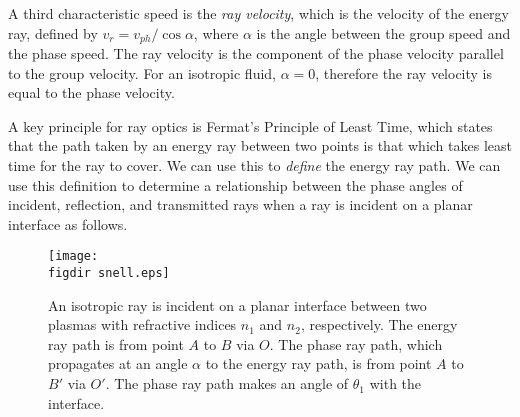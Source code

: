 \documentclass[12pt]{../style-files/ociamthesis}
\begin{document}
	A third characteristic speed is the \textit{ray velocity}, which is the velocity of the energy ray, defined by $v_r = v_{ph}/\cos{\alpha}$, where $\alpha$ is the angle between the group speed and the phase speed. The ray velocity is the component of the phase velocity parallel to the group velocity. For an isotropic fluid, $\alpha = 0$, therefore the ray velocity is equal to the phase velocity.
	
	A key principle for ray optics is Fermat's Principle of Least Time, which states that the path taken by an energy ray between two points is that which takes least time for the ray to cover. We can use this to \textit{define} the energy ray path. We can use this definition to determine a relationship between the phase angles of incident, reflection, and transmitted rays when a ray is incident on a planar interface as follows.
	
	\begin{figure}
		\centering
		\texttt{[image: \\figdir snell.eps]}
		\caption{An isotropic ray is incident on a planar interface between two plasmas with refractive indices $n_1$ and $n_2$, respectively. The energy ray path is from point $A$ to $B$ via $O$. The phase ray path, which propagates at an angle $\alpha$ to the energy ray path, is from point $A$ to $B'$ via $O'$. The phase ray path makes an angle of $\theta_1$ with the interface.}
		\label{fig: fermat}
	\end{figure}
	
\end{document}
